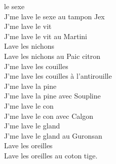 
 le sexe ~~~~~~~~~~~~~~~~~~~~~~~~\bissimple
\\J'me lave le sexe au tampon Jex
\\J'me lave le vit ~~~~~~~~~~~~~~~~~~~~~~~\bissimple
\\J'me lave le vit au Martini
\\Lave les nichons ~~~~~~~~~~~~~~~~~~~~~~~~~~~~~~~~~~~~~~~~~~\bissimple
\\Lave les nichons au Paic citron
\\J'me lave les couilles ~~~~~~~~~~~~~~~~~~~~~~~~~~~~~~~~~~~~\bissimple
\\J'me lave les couilles à l'antirouille
\\J'me lave la pine ~~~~~~~~~~~~~~~~~~~~~~~~~~~~~~~~~~~~~~~~~\bissimple
\\J'me lave la pine avec Soupline
\\J'me lave le con ~~~~~~~~~~~~~~~~~~~~~~~~~~~~~~~~~~~~~~~~~~\bissimple
\\J'me lave le con avec Calgon
\\J'me lave le gland ~~~~~~~~~~~~~~~~~~~~~~~~~~~~~~~~~~~~~~~~\bissimple
\\J'me lave le gland au Guronsan
\\Lave les oreilles ~~~~~~~~~~~~~~~~~~~~~~~~~~~~~~~~~~~~~~~~~~~\bissimple
\\Lave les oreilles au coton tige.
\\
\breakpage